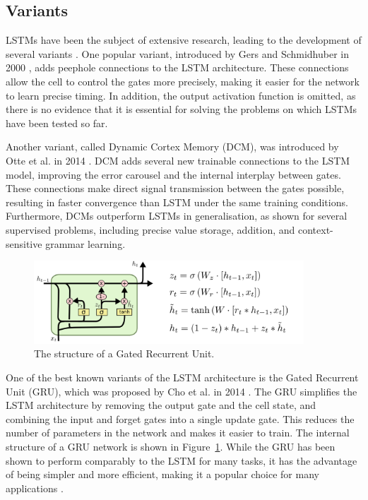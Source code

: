 \documentclass{article}
\newcommand{\reffig}[1]{Figure~\ref{#1}}
\begin{document}
\subsection{Variants}
\label{sec:3.1}

LSTMs have been the subject of extensive research, leading to the development of several
variants \cite{greffLSTMSearchSpace2017}. One popular variant, introduced by Gers and
Schmidhuber in 2000 \cite{gersRecurrentNetsTime2000}, adds peephole connections to the
LSTM architecture. These connections allow the cell to control the gates more precisely,
making it easier for the network to learn precise timing. In addition, the output
activation function is omitted, as there is no evidence that it is essential for solving
the problems on which LSTMs have been tested so far.

Another variant, called Dynamic Cortex Memory (DCM), was introduced by Otte et al. in 2014
\cite{otte2014dynamic}. DCM adds several new trainable connections to the LSTM model,
improving the error carousel and the internal interplay between gates. These connections
make direct signal transmission between the gates possible, resulting in faster
convergence than LSTM under the same training conditions. Furthermore, DCMs outperform
LSTMs in generalisation, as shown for several supervised problems, including precise value
storage, addition, and context-sensitive grammar learning.


\begin{figure}[htbp]
  \centering
  \includegraphics[width=0.9\textwidth]{LSTM3-var-GRU.png}
  \caption{The structure of a Gated Recurrent Unit. \cite{olahUnderstandingLSTM}}
  \label{fig:gru}
\end{figure}
One of the best known variants of the LSTM architecture is the Gated Recurrent Unit (GRU),
which was proposed by Cho et al. in 2014 \cite{choLearningPhraseRepresentations2014}. The
GRU simplifies the LSTM architecture by removing the output gate and the cell state, and
combining the input and forget gates into a single update gate. This reduces the number of
parameters in the network and makes it easier to train. The internal structure of a GRU
network is shown in \reffig{fig:gru}. While the GRU has been shown to perform comparably
to the LSTM for many tasks, it has the advantage of being simpler and more efficient,
making it a popular choice for many applications \cite{Yang2020}.
\end{document}
